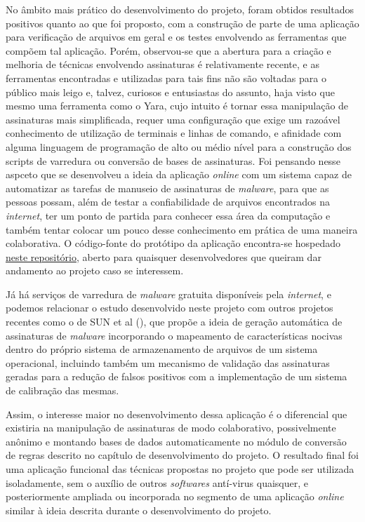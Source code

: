 No âmbito mais prático do desenvolvimento do projeto, foram obtidos resultados
positivos quanto ao que foi proposto, com a construção de parte de uma aplicação
para verificação de arquivos em geral e os testes envolvendo as ferramentas que
compõem tal aplicação. Porém, observou-se que a abertura para a criação e
melhoria de técnicas envolvendo assinaturas é relativamente recente, e as
ferramentas encontradas e utilizadas para tais fins não são voltadas para o
público mais leigo e, talvez, curiosos e entusiastas do assunto, haja visto que
mesmo uma ferramenta como o Yara, cujo intuito é tornar essa manipulação de
assinaturas mais simplificada, requer uma configuração que exige um razoável
conhecimento de utilização de terminais e linhas de comando, e afinidade com
alguma linguagem de programação de alto ou médio nível para a construção dos
scripts de varredura ou conversão de bases de assinaturas. Foi pensando nesse
aspceto que se desenvolveu a ideia da aplicação \textit{online} com um sistema
capaz de automatizar as tarefas de manuseio de assinaturas de \textit{malware},
para que as pessoas possam, além de testar a confiabilidade de arquivos
encontrados na \textit{internet}, ter um ponto de partida para conhecer essa
área da computação e também tentar colocar um pouco desse conhecimento em
prática de uma maneira colaborativa. O código-fonte do protótipo da aplicação
encontra-se hospedado \href{https://github.com/ltgouvea/TCC }{neste
repositório},  aberto para quaisquer desenvolvedores que queiram dar andamento
ao projeto caso se interessem.

Já há serviços de varredura de \textit{malware} gratuita disponíveis pela
\textit{internet}, e podemos relacionar o estudo desenvolvido neste
projeto com outros projetos recentes como o de SUN et al (\citeyear{sun2012automated}),
que propõe a ideia de  geração automática de assinaturas de \textit{malware} incorporando
o mapeamento de características nocivas dentro do próprio sistema de armazenamento de arquivos
de um sistema operacional, incluindo também um mecanismo de validação das assinaturas
geradas para a redução de falsos positivos com a implementação de um sistema de calibração
das mesmas.

Assim, o interesse maior no desenvolvimento dessa aplicação é
o diferencial que existiria na manipulação de assinaturas de modo colaborativo,
possivelmente anônimo e montando bases de dados automaticamente no módulo de
conversão de regras descrito no capítulo de desenvolvimento do projeto. O
resultado final foi uma aplicação funcional das técnicas propostas no projeto
que pode ser utilizada isoladamente, sem o auxílio de outros \textit{softwares}
antí-virus quaisquer, e posteriormente ampliada ou incorporada no segmento de
uma aplicação \textit{online} similar à ideia descrita durante o desenvolvimento
do projeto.
